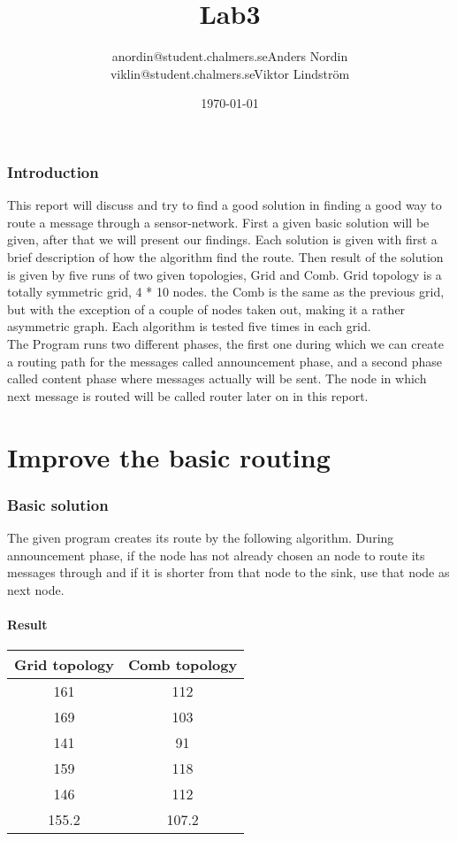 \documentclass{article}
\title{Lab3}
\author{anordin@student.chalmers.se\quad Anders Nordin\\
        viklin@student.chalmers.se\quad Viktor Lindstr\"{o}m}
\date{\today}
\begin{document}
\maketitle
\newpage

\section{Introduction}
  This report will discuss and try to find a good solution in finding a 
  good way to route a message through a sensor-network.
  First a given basic solution will be given, after that
  we will present our findings. Each solution is given with first
  a brief description of how the algorithm find the route. Then 
  result of the solution is given by five runs of two given topologies,
  Grid and Comb. Grid topology is a totally symmetric grid, 4 * 10 nodes.
  the Comb is the same as the previous grid, but with the exception of
  a couple of nodes taken out, making it a rather asymmetric graph.
  Each algorithm is tested five times in each grid.\\
  The Program runs two different phases, the first one during 
  which we can create a routing path for the messages called 
  announcement phase, and a second phase called content phase where
  messages actually will be sent. The node in which next message
  is routed will be called router later on in this report.
\part{Improve the basic routing}
\section{Basic solution}
  The given program creates its route by the following algorithm.
  During announcement phase, if the node has not already chosen an 
  node to route its messages through and if it is shorter
  from that node to the sink, use that node as next node.
  \subsection{Result}
    \begin{tabular}{c|c}
      Grid topology & Comb topology\\
      \hline
      \hline
      161 & 112\\
      169 & 103\\
      141 & 91\\
      159 & 118\\
      146 & 112\\
      \hline
      155.2&107.2\\
    \end{tabular}
\end{document}
